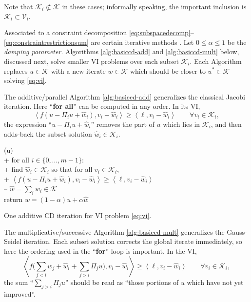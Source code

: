\documentclass[letterpaper,final,12pt,reqno]{amsart}
\theoremstyle{cstyle}
\theoremstyle{cstyle*}
\theoremstyle{dstyle}
\numberwithin{equation}{section}
\numberwithin{figure}{section}
\numberwithin{table}{section}
\numberwithin{theorem}{section}
\newcommand{\cK}{\mathcal{K}}
\newcommand{\cV}{\mathcal{V}}
\newcommand{\ip}[2]{\left<#1,#2\right>}
\begin{document}
Note that $\cK_i \not\subset \cK$ in these cases; informally speaking, the important inclusion is $\cK_i \subset \cV_i$.

Associated to a constraint decomposition \eqref{eq:subspacedecomp}--\eqref{eq:constraintrestrictionsum} are certain iterative methods \cite{Tai2003,Xu1992}.  Let $0\le \alpha \le 1$ be the \emph{damping parameter}.  Algorithms \ref{alg:basiccd-add} and \ref{alg:basiccd-mult} below, discussed next, solve smaller VI problems over each subset $\cK_i$.  Each Algorithm replaces $u \in \cK$ with a new iterate $w\in\cK$ which should be closer to $u^* \in \cK$ solving \eqref{eq:vi}.

The additive/parallel  Algorithm \ref{alg:basiccd-add} generalizes the classical Jacobi iteration.  Here ``\textbf{for all}'' can be computed in any order.  In its VI,
\begin{equation}
\ip{f(u - \Pi_i u + \hat w_i)}{v_i-\hat w_i} \ge \ip{\ell}{v_i-\hat w_i} \qquad \forall v_i \in \mathcal{K}_i, \label{eq:cdaddvi}
\end{equation}
the expression ``$u-\Pi_iu+\hat w_i$'' removes the part of $u$ which lies in $\mathcal{K}_i$, and then adds-back the subset solution $\hat w_i \in \mathcal{K}_i$.

\begin{pseudofloat}[H]
\begin{pseudo*}
(u)\text{:} \\+
    for all $i \in \{0,\dots,m-1\}$: \\+
        \rm{find} $\hat w_i\in \cK_i$ \rm{so that for all} $v_i\in \cK_i$, \\+
            $\ip{f(u - \Pi_i u + \hat w_i)}{v_i-\hat w_i} \ge \ip{\ell}{v_i-\hat w_i}$ \\--
    $\hat w = \sum_i \hat w_i\in\cK$ \\
    return $w=(1-\alpha) u + \alpha \hat w$
\end{pseudo*}
\caption{One additive CD iteration for VI problem \eqref{eq:vi}.}
\label{alg:basiccd-add}
\end{pseudofloat}

The multiplicative/successive  Algorithm \ref{alg:basiccd-mult} generalizes the Gauss-Seidel iteration.  Each subset solution corrects the global iterate immediately, so here the ordering used in the ``\textbf{for}'' loop is important.  In the VI,
\begin{equation}
\ip{f\Big(\sum_{j<i} w_j + \hat w_i + \sum_{j>i} \Pi_j u\Big)}{v_i-\hat w_i} \ge \ip{\ell}{v_i-\hat w_i} \qquad \forall v_i \in \mathcal{K}_i, \label{eq:cdmultvi}
\end{equation}
the sum ``$\sum_{j>i} \Pi_j u$'' should be read as ``those portions of $u$ which have not yet improved''.
\end{document}
